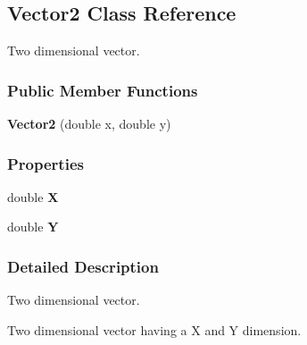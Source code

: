 \hypertarget{classDataTools_1_1Vector2}{}\subsection{Vector2 Class Reference}
\label{classDataTools_1_1Vector2}


Two dimensional vector.  


\subsubsection*{Public Member Functions}
\begin{DoxyCompactItemize}
\item 
\mbox{\label{classDataTools_1_1Vector2_a54f14911c467791709425b5816b5ef33}} 
{\bfseries Vector2} (double x, double y)
\end{DoxyCompactItemize}
\subsubsection*{Properties}
\begin{DoxyCompactItemize}
\item 
\mbox{\label{classDataTools_1_1Vector2_a1059b82f84827fc49ea81b12566b3cdb}} 
double {\bfseries X}
\item 
\mbox{\label{classDataTools_1_1Vector2_ac8d59bf77d5ef21e7c7a88b08f14c825}} 
double {\bfseries Y}
\end{DoxyCompactItemize}


\subsubsection{Detailed Description}
Two dimensional vector. 

Two dimensional vector having a X and Y dimension. 